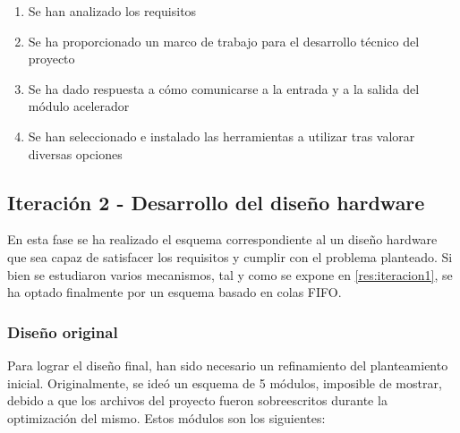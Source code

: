 \begin{enumerate}
    \item Se han analizado los requisitos
    \item Se ha proporcionado un marco de trabajo para el desarrollo técnico del proyecto
    \item Se ha dado respuesta a cómo comunicarse a la entrada y a la salida del módulo acelerador
    \item Se han seleccionado e instalado las herramientas a utilizar tras valorar diversas opciones
\end{enumerate}

\subsection{Iteración 2 - Desarrollo del diseño hardware}

En esta fase se ha realizado el esquema correspondiente al un diseño hardware que sea capaz de satisfacer los requisitos y cumplir con el problema planteado. Si bien se estudiaron varios mecanismos, tal y como se expone en \ref{res:iteracion1}, se ha optado finalmente por un esquema basado en colas FIFO. 

\subsubsection{Diseño original}
Para lograr el diseño final, han sido necesario un refinamiento del planteamiento inicial. Originalmente, se ideó un esquema de 5 módulos, imposible de mostrar, debido a que los archivos del proyecto fueron sobreescritos durante la optimización del mismo. Estos módulos son los siguientes:

